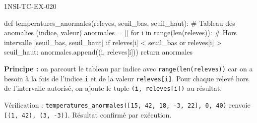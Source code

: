 \begin{corrige}{1NSI-TC-EX-020}
\begin{python}
def temperatures_anormales(releves, seuil_bas, seuil_haut):
    # Tableau des anomalies (indice, valeur)
    anormales = []
    for i in range(len(releves)):
        # Hors intervalle [seuil_bas, seuil_haut]
        if releves[i] < seuil_bas or releves[i] > seuil_haut:
            anormales.append((i, releves[i]))
    return anormales
\end{python}

\textbf{Principe :} on parcourt le tableau par indice avec \lstinline{range(len(releves))} car on a besoin à la fois de l'indice \lstinline{i} et de la valeur \lstinline{releves[i]}. Pour chaque relevé hors de l'intervalle autorisé, on ajoute le tuple \lstinline{(i, releves[i])} au résultat.

Vérification : \lstinline{temperatures_anormales([15, 42, 18, -3, 22], 0, 40)} renvoie \lstinline{[(1, 42), (3, -3)]}. Résultat confirmé par exécution.
\end{corrige}
